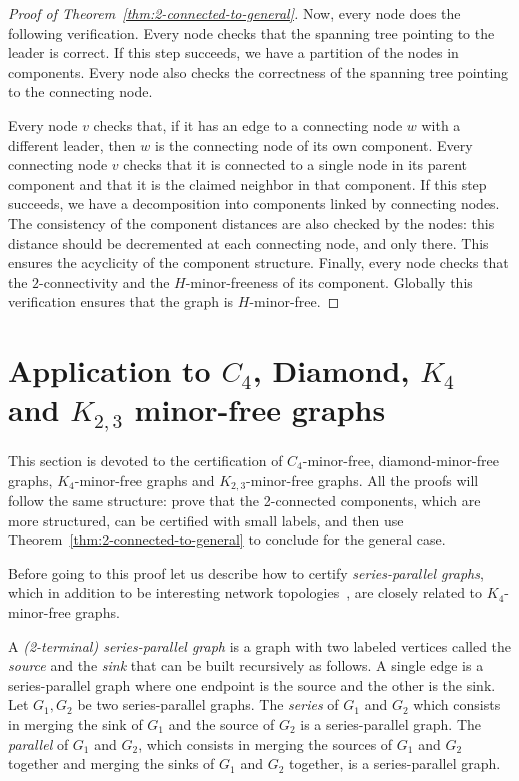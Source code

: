 \documentclass[a4paper,thm-restate,USenglish]{lipics-v2019}
\begin{document}
\begin{proof}[Proof of Theorem~\ref{thm:2-connected-to-general}]
Now, every node does the following verification. 
Every node checks that the spanning tree pointing to the leader is correct. If this step succeeds, we have a partition of the nodes in components. Every node also checks the correctness of the spanning tree pointing to the connecting node.

Every node $v$ checks that, if it has an edge to a connecting node $w$ with a different leader, then $w$ is the connecting node of its own component. Every connecting node $v$ checks that it is connected to a single node in its parent component and that it is the claimed neighbor in that component.
If this step succeeds, we have a decomposition into components linked by connecting nodes. 
The consistency of the component distances are also checked by the nodes: this distance should be decremented at each connecting node, and only there. This ensures the acyclicity of the component structure.
Finally, every node checks that the $2$-connectivity and the $H$-minor-freeness of its component. 
Globally this verification ensures that the graph is $H$-minor-free.
\end{proof}


\section{Application to $C_4$, Diamond, $K_4$ and $K_{2,3}$ minor-free graphs}
\label{sec:diamond-etc}

This section is devoted to the certification of $C_4$-minor-free, diamond-minor-free graphs, $K_4$-minor-free graphs and $K_{2,3}$-minor-free graphs.
All the proofs will follow the same structure: prove that the 2-connected components, which are more structured, can be certified with small labels, and then use Theorem~\ref{thm:2-connected-to-general} to conclude for the general case. 

Before going to this proof let us describe how to certify \emph{series-parallel graphs}, which in addition to be  interesting network topologies~\cite{FlocchiniL03}, are closely related to $K_4$-minor-free graphs.

\begin{definition}
A \emph{(2-terminal) series-parallel graph} is a graph with two labeled vertices called the \emph{source} and the \emph{sink} that can be built recursively as follows. 
A single edge is a series-parallel graph where one endpoint is the source and the other is the sink.
Let $G_1,G_2$ be two series-parallel graphs. The \emph{series} of $G_1$ and $G_2$ which consists in merging the sink of $G_1$ and the source of $G_2$ is a series-parallel graph.
The \emph{parallel} of $G_1$ and $G_2$, which consists in merging the sources of $G_1$ and $G_2$ together and merging the sinks of $G_1$ and $G_2$ together, is a series-parallel graph.
\end{definition}
\end{document}
